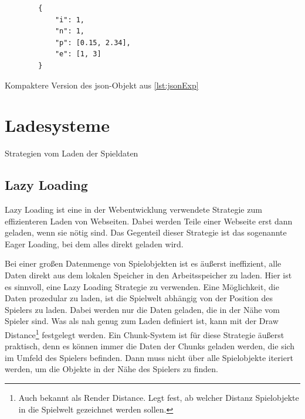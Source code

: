 \begin{listing}[htp]
    \begin{verbatim}
        {
            "i": 1,
            "n": 1,
            "p": [0.15, 2.34],
            "e": [1, 3]
        }
    \end{verbatim}
    \caption{Kompaktere Version des \ac{json}-Objekt aus \ref{lst:jsonExp}}
    \label{lst:shorterJson}
\end{listing}




\section{Ladesysteme}\label{sect:ladesysteme}
Strategien vom Laden der Spieldaten


\subsection{Lazy Loading} \label{ssect:lazyloading}
Lazy Loading ist eine in der Webentwicklung verwendete Strategie zum effizienteren Laden von Webseiten. Dabei werden Teile einer Webseite erst dann geladen, wenn sie nötig sind. Das Gegenteil dieser Strategie ist das sogenannte Eager Loading, bei dem alles direkt geladen wird.\cite{cloudflareLazyLoad}

Bei einer großen Datenmenge von Spielobjekten ist es äußerst ineffizient, alle Daten direkt aus dem lokalen Speicher in den Arbeitsspeicher zu laden. Hier ist es sinnvoll, eine Lazy Loading Strategie zu verwenden. Eine Möglichkeit, die Daten prozedular zu laden, ist die Spielwelt abhängig von der Position des Spielers zu laden. Dabei werden nur die Daten geladen, die in der Nähe vom Spieler sind. Was als nah genug zum Laden definiert ist, kann mit der Draw Distance\footnote{Auch bekannt als Render Distance. Legt fest, ab welcher Distanz Spielobjekte in die Spielwelt gezeichnet werden sollen.\cite{nerdburglarsWhatDraw}} festgelegt werden. Ein Chunk-System ist für diese Strategie äußerst praktisch, denn es können immer die Daten der Chunks geladen werden, die sich im Umfeld des Spielers befinden. Dann muss nicht über alle Spielobjekte iteriert werden, um die Objekte in der Nähe des Spielers zu finden.




